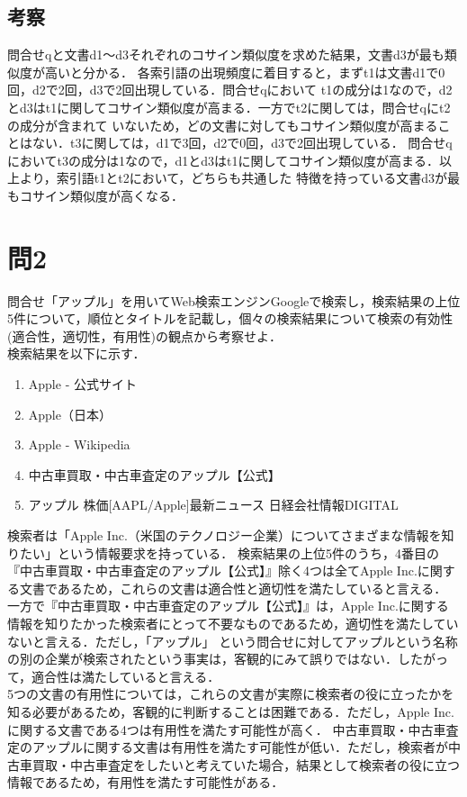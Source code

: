 \documentclass[dvipdfmx,autodetect-engine,titlepage]{jsarticle}
\begin{document}
\subsection{考察}
問合せqと文書d1〜d3それぞれのコサイン類似度を求めた結果，文書d3が最も類似度が高いと分かる．
各索引語の出現頻度に着目すると，まずt1は文書d1で0回，d2で2回，d3で2回出現している．問合せqにおいて
t1の成分は1なので，d2とd3はt1に関してコサイン類似度が高まる．一方でt2に関しては，問合せqにt2の成分が含まれて
いないため，どの文書に対してもコサイン類似度が高まることはない．t3に関しては，d1で3回，d2で0回，d3で2回出現している．
問合せqにおいてt3の成分は1なので，d1とd3はt1に関してコサイン類似度が高まる．以上より，索引語t1とt2において，どちらも共通した
特徴を持っている文書d3が最もコサイン類似度が高くなる．


\section{問2}
問合せ「アップル」を用いてWeb検索エンジンGoogleで検索し，検索結果の上位5件について，順位とタイトルを記載し，個々の検索結果について検索の有効性(適合性，適切性，有用性)の観点から考察せよ．\\

検索結果を以下に示す．
\begin{enumerate}
  \item Apple - 公式サイト
  \item Apple（日本）
  \item Apple - Wikipedia
  \item 中古車買取・中古車査定のアップル【公式】
  \item アップル 株価[AAPL/Apple]最新ニュース 日経会社情報DIGITAL
\end{enumerate}

検索者は「Apple Inc.（米国のテクノロジー企業）についてさまざまな情報を知りたい」という情報要求を持っている．
検索結果の上位5件のうち，4番目の『中古車買取・中古車査定のアップル【公式】』除く4つは全てApple Inc.に関する文書であるため，これらの文書は適合性と適切性を満たしていると言える．\\
一方で『中古車買取・中古車査定のアップル【公式】』は，Apple Inc.に関する情報を知りたかった検索者にとって不要なものであるため，適切性を満たしていないと言える．ただし，「アップル」
という問合せに対してアップルという名称の別の企業が検索されたという事実は，客観的にみて誤りではない．したがって，適合性は満たしていると言える．\\
5つの文書の有用性については，これらの文書が実際に検索者の役に立ったかを知る必要があるため，客観的に判断することは困難である．ただし，Apple Inc.に関する文書である4つは有用性を満たす可能性が高く．
中古車買取・中古車査定のアップルに関する文書は有用性を満たす可能性が低い．ただし，検索者が中古車買取・中古車査定をしたいと考えていた場合，結果として検索者の役に立つ情報であるため，有用性を満たす可能性がある．\\
\end{document}
